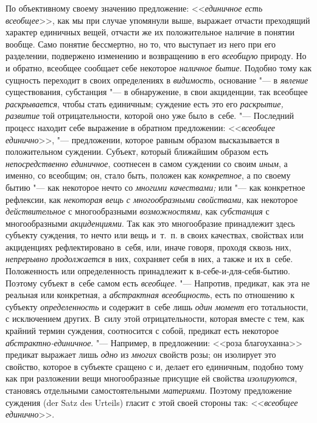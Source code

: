 По объективному своему значению предложение: <<{\em единичное есть всеобщее}>>,
как мы при случае упомянули выше, выражает отчасти преходящий характер
единичных вещей, отчасти же их положительное наличие в понятии вообще. Само
понятие бессмертно, но то, что выступает из него при его разделении, подвержено
изменению и возвращению в его {\em всеобщую} природу. Но и обратно, всеобщее
сообщает себе некоторое {\em наличное бытие}. Подобно тому как сущность
переходит в своих определениях в {\em видимость}, основание "---
в {\em явление} существования, субстанция "--- в обнаружение, в свои
акциденции, так всеобщее {\em раскрывается}, чтобы стать единичным; суждение
есть это его {\em раскрытие, развитие} той отрицательности, которой оно
уже было в~себе. "--- Последний процесс находит себе выражение в обратном
предложении: <<{\em всеобщее единично}>>, "--- предложении, которое равным
образом высказывается в положительном суждении. Субъект, который ближайшим
образом есть {\em непосредственно единичное}, соотнесен в самом суждении со
своим {\em иным}, а именно, со всеобщим; он, стало быть, положен как
{\em конкретное}, а по своему бытию "--- как некоторое нечто со
{\em многими качествами;} или "--- как конкретное рефлексии, как {\em некоторая
вещь с многообразными свойствами}, как некоторое {\em действительное}
с многообразными {\em возможностями}, как {\em субстанция} с многообразными
{\em акциденциями}. Так как это многообразие принадлежит здесь субъекту
суждения, то нечто или вещь и~т.~п. в своих качествах, свойствах или
акциденциях рефлектировано в~себя, или, иначе говоря, проходя сквозь них,
{\em непрерывно продолжается} в них, сохраняет себя в них, а также и их в~себе.
Положенность или определенность принадлежит к в-себе-и-для-себя-бытию. Поэтому
субъект в~себе самом есть {\em всеобщее}. "--- Напротив, предикат, как эта не
реальная или конкретная, а {\em абстрактная всеобщность}, есть по отношению к
субъекту {\em определенность} и содержит в~себе лишь {\em один момент} его
тотальности, с исключением других. В~силу этой отрицательности, которая вместе
с тем, как крайний термин суждения, соотносится с собой, предикат есть
некоторое {\em абстрактно-единичное}. "--- Например, в предложении: <<роза
благоуханна>> предикат выражает лишь {\em одно} из {\em многих} свойств розы;
он изолирует это свойство, которое в субъекте сращено с и, делает его
единичным, подобно тому как при разложении вещи многообразные присущие ей
свойства {\em изолируются}, становясь отдельными самостоятельными
{\em материями}. Поэтому предложение суждения (der Satz des
Urteils) гласит с этой своей стороны так: <<{\em всеобщее единично}>>.

